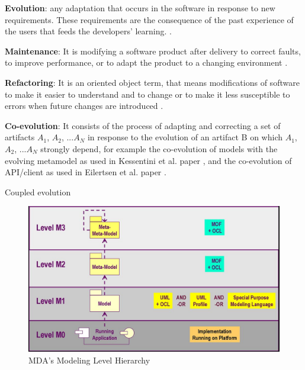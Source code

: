 \textbf{Evolution}: any adaptation that occurs in the software in response to new requirements. These requirements are the consequence of the past experience of the users that feeds the developers' learning. \cite{bennett2000software}. 

\textbf{Maintenance}: It is modifying a software product after delivery to correct faults, to improve performance, or to adapt the product to a changing environment \cite{schneidewind1987state}.

\textbf{Refactoring}: It is an oriented object term, that means modifications of software to make it easier to understand and to change or to make it less susceptible to errors when future changes are introduced \cite{mens2004survey}. 

\textbf{Co-evolution}: It consists of the process of adapting and correcting a set of artifacts $A_1$, $A_2$, ...$A_N$ in response to the evolution of an artifact B on which $A_1$, $A_2$, ...$A_N$  strongly depend, for example the co-evolution of models with the evolving metamodel as used in Kessentini et al. paper \cite{Kessentini2016automated}, and the co-evolution of API/client as used in Eilertsen et al. paper \cite{8443581} .

Coupled evolution \cite{herrmannsdoerfer2009cope}
\begin{figure}[htbp]
	\begin{center}
		\includegraphics[width=0.6\linewidth]{./pics/soaPics/mofmodellevels.png}
	\end{center}
	\caption{MDA’s Modeling Level Hierarchy}
	\label{fig:mofmodellevels}
\end{figure}

